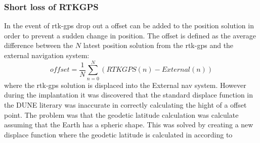 \subsubsection{Short loss of RTKGPS}\label{ss:ShortLoss}
In the event of \gls{rtk-gps} drop out a offset can be added to the position solution in order to prevent a sudden change in position. The offset is defined as the average difference between the $N$ latest position solution from the \gls{rtk-gps} and the external navigation system:
\begin{equation}
offset = \frac{1}{N}\sum_{n=0}^N(RTKGPS(n)-External(n))
\end{equation}
where the \gls{rtk-gps} solution is displaced into the External nav system. However during the implantation it was discovered that the standard displace function in the DUNE literary was inaccurate in correctly calculating the hight of a offset point. The problem was that the geodetic latitude calculation was calculate assuming that the Earth has a spheric shape. This was solved by creating a new displace function where the geodetic latitude is calculated in according to